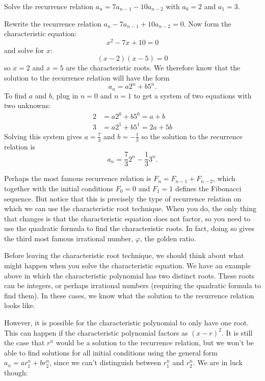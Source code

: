 \documentclass[12pt]{article}
\begin{document}
\begin{example}
  Solve the recurrence relation $a_n = 7a_{n-1} - 10 a_{n-2}$ with $a_0 = 2$ and $a_1 = 3$.
  \begin{solution}
   Rewrite the recurrence relation $a_n - 7a_{n-1} + 10a_{n-2} = 0$.  Now form the characteristic equation:
   \[x^2 - 7x + 10 = 0\]
   and solve for $x$:
   \[(x - 2) (x - 5) = 0\]
   so $x = 2$ and $x = 5$ are the characteristic roots.  We therefore know that the solution to the recurrence relation will have the form
   \[a_n = a 2^n + b 5^n.\]
   To find $a$ and $b$, plug in $n =0$ and $n = 1$ to get a system of two equations with two unknowns:
   \begin{align*}
    2 & = a 2^0 + b 5^0 = a + b\\
    3 & = a 2^1 + b 5^1 = 2a + 5b
   \end{align*}
  Solving this system gives $a = \frac{7}{3}$ and $b = -\frac{1}{3}$ so the solution to the recurrence relation is
  \[a_n = \frac{7}{3}2^n - \frac{1}{3} 3^n.\]
  \end{solution}

\end{example}

Perhaps the most famous recurrence relation is $F_n = F_{n-1} + F_{n-2}$, which together with the initial conditions $F_0 = 0$ and $F_1= 1$ defines the Fibonacci sequence.  But notice that this is precisely the type of recurrence relation on which we can use the characteristic root technique.  When you do, the only thing that changes is that the characteristic equation does not factor, so you need to use the quadratic formula to find the characteristic roots.  In fact, doing so gives the third most famous irrational number, $\varphi$, the golden ratio.

Before leaving the characteristic root technique, we should think about what might happen when you solve the characteristic equation.  We have an example above in which the characteristic polynomial has two distinct roots.  These roots can be integers, or perhaps irrational numbers (requiring the quadratic formula to find them).  In these cases, we know what the solution to the recurrence relation looks like.

However, it is possible for the characteristic polynomial to only have one root.  This can happen if the characteristic polynomial factors as $(x - r)^2$.  It is still the case that $r^n$ would be a solution to the recurrence relation, but we won't be able to find solutions for all initial conditions using the general form $a_n = ar_1^n + br_2^n$, since we can't distinguish between $r_1^n$ and $r_2^n$.  We are in luck though:
\end{document}
